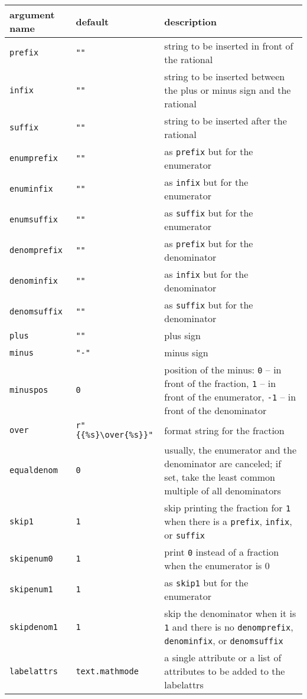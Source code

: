 \medskip
\begin{tabularx}{\linewidth}{ll>{\raggedright\arraybackslash}X}
argument name&default&description\\
\hline
\texttt{prefix}&\texttt{""}&string to be inserted in front of the rational\\
\texttt{infix}&\texttt{""}&string to be inserted between the plus or minus sign and the rational\\
\texttt{suffix}&\texttt{""}&string to be inserted after the rational\\
\texttt{enumprefix}&\texttt{""}&as \texttt{prefix} but for the enumerator\\
\texttt{enuminfix}&\texttt{""}&as \texttt{infix} but for the enumerator\\
\texttt{enumsuffix}&\texttt{""}&as \texttt{suffix} but for the enumerator\\
\texttt{denomprefix}&\texttt{""}&as \texttt{prefix} but for the denominator\\
\texttt{denominfix}&\texttt{""}&as \texttt{infix} but for the denominator\\
\texttt{denomsuffix}&\texttt{""}&as \texttt{suffix} but for the denominator\\
\texttt{plus}&\texttt{""}&plus sign\\
\texttt{minus}&\texttt{"-"}&minus sign\\
\texttt{minuspos}&\texttt{0}&position of the minus: \texttt{0} -- in front of the fraction, \texttt{1} -- in front of the enumerator, \texttt{-1} -- in front of the denominator\\
\texttt{over}&\texttt{r"\{\{\%s\}\textbackslash over\{\%s\}\}"}&format string for the fraction\\
\texttt{equaldenom}&\texttt{0}&usually, the enumerator and the denominator are canceled; if set, take the least common multiple of all denominators\\
\texttt{skip1}&\texttt{1}&skip printing the fraction for \texttt{1} when there is a \texttt{prefix}, \texttt{infix}, or \texttt{suffix}\\
\texttt{skipenum0}&\texttt{1}&print \texttt{0} instead of a fraction when the enumerator is 0\\
\texttt{skipenum1}&\texttt{1}&as \texttt{skip1} but for the enumerator\\
\texttt{skipdenom1}&\texttt{1}&skip the denominator when it is \texttt{1} and there is no \texttt{denomprefix}, \texttt{denominfix}, or \texttt{denomsuffix}\\
\texttt{labelattrs}&\texttt{text.mathmode}&a single attribute or a list of attributes to be added to the labelattrs\\
\end{tabularx}
\medskip

